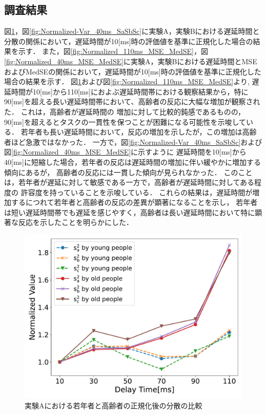 \subsection{調査結果}
図\ref{fig:Normalized-Var_110ms_SaSbSc}，図\ref{fig:Normalized-Var_40ms_SaSbSc}に実験A，実験Bにおける遅延時間と分散の関係において，遅延時間が10[ms]時の評価値を基準に正規化した場合の結果を示す．
また，図\ref{fig:Normalized_110ms_MSE_MedSE}，図\ref{fig:Normalized_40ms_MSE_MedSE}に実験A，実験Bにおける遅延時間とMSEおよびMedSEの関係において，遅延時間が10[ms]時の評価値を基準に正規化した場合の結果を示す．
図\ref{fig:Normalized-Var_110ms_SaSbSc}および図\ref{fig:Normalized_110ms_MSE_MedSE}より,
遅延時間が10[ms]から110[ms]におよぶ遅延時間帯における観察結果から，特に90[ms]を超える長い遅延時間帯において、高齢者の反応に大幅な増加が観察された．
これは，高齢者が遅延時間の
増加に対して比較的鈍感であるものの，90[ms]を超えるとタスクの一貫性を保つことが困難になる可能性を示唆している．
若年者も長い遅延時間において，反応の増加を示したが，この増加は高齢者ほど急激ではなかった．
一方で，図\ref{fig:Normalized-Var_40ms_SaSbSc}および図\ref{fig:Normalized_40ms_MSE_MedSE}に示すように
遅延時間を10[ms]から40[ms]に短縮した場合，若年者の反応は遅延時間の増加に伴い緩やかに増加する傾向にあるが，
高齢者の反応には一貫した傾向が見られなかった．
このことは，若年者が遅延に対して敏感である一方で，高齢者が遅延時間に対してある程度の
許容度を持っていることを示唆している．
これらの結果は，遅延時間が増加するにつれて若年者と高齢者の反応の差異が顕著になることを示し，
若年者は短い遅延時間帯でも遅延を感じやすく，高齢者は長い遅延時間において特に顕著な反応を示したことを明らかにした．
\begin{figure}[tbp]
  \centering
  \includegraphics[scale=0.3]{figures/Honbann/Comparison_young_old/110_var_normalized.pdf}
  \caption{実験Aにおける若年者と高齢者の正規化後の分散の比較}
  \label{fig:Normalized-Var_110ms_SaSbSc}
\end{figure}
